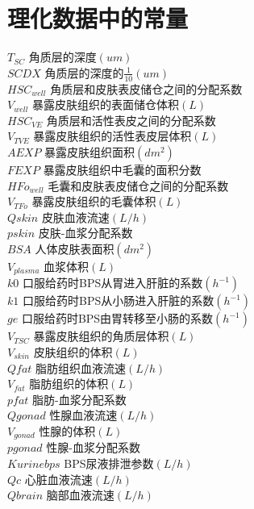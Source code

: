 \documentclass[a4paper,punct=banjiao,twoside]{ctexrep}
\theoremstyle{plain}
\theoremstyle{definition}
\theoremstyle{remark}
\begin{document}
\section*{理化数据中的常量}
\noindent$T_{SC}$ {\hfill  角质层的深度$(um)$}\\
$SCDX$ {\hfill  角质层的深度的$\frac{1}{10}(um)$}\\
$HSC_{well}$ {\hfill  角质层和皮肤表皮储仓之间的分配系数}\\
$V_{well}$ {\hfill  暴露皮肤组织的表面储仓体积$(L)$}\\
$HSC_{VE}$ {\hfill  角质层和活性表皮之间的分配系数}\\
$V_{TVE}$ {\hfill  暴露皮肤组织的活性表皮层体积$(L)$}\\
$AEXP $ {\hfill  暴露皮肤组织面积$ (dm^2)$}\\
$ FEXP$ {\hfill  暴露皮肤组织中毛囊的面积分数}\\
$HFo_{well}$ {\hfill  毛囊和皮肤表皮储仓之间的分配系数}\\
$V_{TFo}$ {\hfill  暴露皮肤组织的毛囊体积$(L)$}\\
$ Qskin$ {\hfill  皮肤血液流速$(L/h) $}\\
$ pskin$ {\hfill  皮肤-血浆分配系数}\\
$ BSA$ {\hfill  人体皮肤表面积$(dm^2) $}\\
$V_{plasma}$ {\hfill  血浆体积$(L)$}\\
$k0 $ {\hfill  口服给药时BPS从胃进入肝脏的系数$(h^{-1})$}\\
$k1 $ {\hfill  口服给药时BPS从小肠进入肝脏的系数$(h^{-1})$}\\
$ ge$ {\hfill  口服给药时BPS由胃转移至小肠的系数$(h^{-1})$}\\
$V_{TSC}$ {\hfill  暴露皮肤组织的角质层体积$(L)$}\\
$V_{skin}$ {\hfill  皮肤组织的体积$(L)$}\\
$ Qfat$ {\hfill  脂肪组织血液流速$(L/h) $}\\
$V_{fat}$ {\hfill  脂肪组织的体积$(L)$}\\
$ pfat$ {\hfill  脂肪-血浆分配系数}\\
$ Qgonad$ {\hfill  性腺血液流速$(L/h) $}\\
$V_{gonad}$ {\hfill  性腺的体积$(L)$}\\
$ pgonad$ {\hfill  性腺-血浆分配系数}\\
$ Kurinebps $ {\hfill  BPS尿液排泄参数$(L/h)$}\\
$ Qc$ {\hfill  心脏血液流速$(L/h)$}\\
$ Qbrain$ {\hfill  脑部血液流速$(L/h) $}\\
\end{document}
